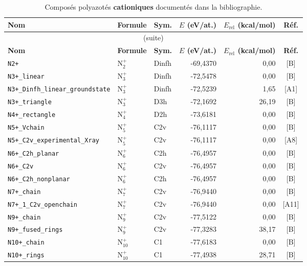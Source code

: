 \begin{longtable}{@{}p{4.4cm}lp{1.5cm}rrc@{}}
\caption{Compos\'es polyazot\'es \textbf{cationiques} document\'es dans la bibliographie.}
\label{tab:final-cation}\\
\toprule
\textbf{Nom} & \textbf{Formule} & \textbf{Sym.} & \textbf{$E$ (eV/at.)} & \textbf{$E_{\mathrm{rel}}$ (kcal/mol)} & \textbf{R\'ef.} \\
\midrule
\endfirsthead
\multicolumn{6}{c}{\small (suite)}\\
\toprule
\textbf{Nom} & \textbf{Formule} & \textbf{Sym.} & \textbf{$E$ (eV/at.)} & \textbf{$E_{\mathrm{rel}}$ (kcal/mol)} & \textbf{R\'ef.} \\
\midrule
\endhead
\bottomrule
\endfoot
\bottomrule
\endlastfoot
\addlinespace
\texttt{N2+} & N$_{2}^{+}$ & Dinfh & -69{,}4370 & 0{,}00 & [B] \\
\addlinespace
\texttt{N3+\_linear} & N$_{3}^{+}$ & Dinfh & -72{,}5478 & 0{,}00 & [B] \\
\texttt{N3+\_Dinfh\_linear\_groundstate} & N$_{3}^{+}$ & Dinfh & -72{,}5239 & 1{,}65 & [A1] \\
\texttt{N3+\_triangle} & N$_{3}^{+}$ & D3h & -72{,}1692 & 26{,}19 & [B] \\
\addlinespace
\texttt{N4+\_rectangle} & N$_{4}^{+}$ & D2h & -73{,}6181 & 0{,}00 & [B] \\
\addlinespace
\texttt{N5+\_Vchain} & N$_{5}^{+}$ & C2v & -76{,}1117 & 0{,}00 & [B] \\
\texttt{N5+\_C2v\_experimental\_Xray} & N$_{5}^{+}$ & C2v & -76{,}1117 & 0{,}00 & [A8] \\
\addlinespace
\texttt{N6+\_C2h\_planar} & N$_{6}^{+}$ & C2h & -76{,}4957 & 0{,}00 & [B] \\
\texttt{N6+\_C2v} & N$_{6}^{+}$ & C2v & -76{,}4957 & 0{,}00 & [B] \\
\texttt{N6+\_C2h\_nonplanar} & N$_{6}^{+}$ & C2h & -76{,}4957 & 0{,}00 & [B] \\
\addlinespace
\texttt{N7+\_chain} & N$_{7}^{+}$ & C2v & -76{,}9440 & 0{,}00 & [B] \\
\texttt{N7+\_1\_C2v\_openchain} & N$_{7}^{+}$ & C2v & -76{,}9440 & 0{,}00 & [A11] \\
\addlinespace
\texttt{N9+\_chain} & N$_{9}^{+}$ & C2v & -77{,}5122 & 0{,}00 & [B] \\
\texttt{N9+\_fused\_rings} & N$_{9}^{+}$ & C2v & -77{,}3283 & 38{,}17 & [B] \\
\addlinespace
\texttt{N10+\_chain} & N$_{10}^{+}$ & C1 & -77{,}6183 & 0{,}00 & [B] \\
\texttt{N10+\_rings} & N$_{10}^{+}$ & C1 & -77{,}4938 & 28{,}71 & [B] \\
\end{longtable}
